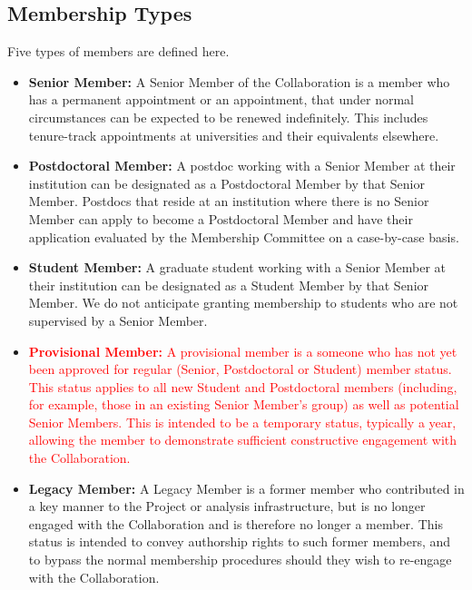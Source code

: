 \documentclass[12pt]{article}
\begin{document}
\vspace{0.2in}
\noindent



\subsection{Membership Types}
\label{sec:memtypes}
Five types of members are defined here.  
\begin{itemize}

\item {\bf Senior Member:} A Senior Member of the Collaboration is a member who has a permanent appointment or an appointment, that under normal circumstances can be expected to be renewed indefinitely.   This includes tenure-track appointments at universities and their equivalents elsewhere.  

\item {\bf Postdoctoral Member:} A postdoc working with a Senior Member at their institution can be designated as a Postdoctoral Member by that Senior Member.  Postdocs that reside at an institution where there is no Senior Member can apply to become a Postdoctoral Member and have their application evaluated by the Membership Committee on a case-by-case basis. 

\item {\bf Student Member:} A graduate student working with a Senior Member at their institution can be designated as a Student Member by that Senior Member.  We do not anticipate granting membership to students who are not supervised by a Senior Member.


\item\textcolor{red}{ {\bf Provisional Member:}  A provisional member is a someone who has not yet been approved for regular
(Senior, Postdoctoral or Student) member status.  This status applies to all new Student and Postdoctoral members
(including, for example, those in an existing Senior Member's group) as well as potential Senior Members.  This is intended to be a temporary status, typically a year, allowing the member to demonstrate
sufficient constructive engagement with the Collaboration.
}


\item {\bf Legacy Member:}  A Legacy Member is a former member who contributed in a key manner to the Project or analysis infrastructure, but is no longer engaged with the Collaboration and is therefore no longer a member.  This status is intended to convey authorship rights to such former members, and to bypass the normal membership procedures should they wish to re-engage with the Collaboration.


\end{itemize}
\end{document}
